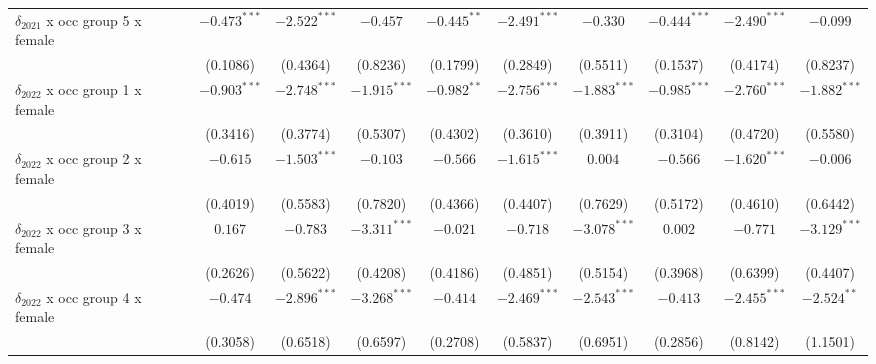 \begin{tabular}{l|ccc|ccc|ccc|}
$\delta_{2021}$ x occ group 5 x female &          $-0.473^{***}$ &  $-2.522^{***}$ &        $-0.457$ &            $-0.445^{**}$ &  $-2.491^{***}$ &        $-0.330$ &           $-0.444^{***}$ &  $-2.490^{***}$ &        $-0.099$ \\
                                       &                (0.1086) &        (0.4364) &        (0.8236) &                 (0.1799) &        (0.2849) &        (0.5511) &                 (0.1537) &        (0.4174) &        (0.8237) \\
$\delta_{2022}$ x occ group 1 x female &          $-0.903^{***}$ &  $-2.748^{***}$ &  $-1.915^{***}$ &            $-0.982^{**}$ &  $-2.756^{***}$ &  $-1.883^{***}$ &           $-0.985^{***}$ &  $-2.760^{***}$ &  $-1.882^{***}$ \\
                                       &                (0.3416) &        (0.3774) &        (0.5307) &                 (0.4302) &        (0.3610) &        (0.3911) &                 (0.3104) &        (0.4720) &        (0.5580) \\
$\delta_{2022}$ x occ group 2 x female &                $-0.615$ &  $-1.503^{***}$ &        $-0.103$ &                 $-0.566$ &  $-1.615^{***}$ &         $0.004$ &                 $-0.566$ &  $-1.620^{***}$ &        $-0.006$ \\
                                       &                (0.4019) &        (0.5583) &        (0.7820) &                 (0.4366) &        (0.4407) &        (0.7629) &                 (0.5172) &        (0.4610) &        (0.6442) \\
$\delta_{2022}$ x occ group 3 x female &                 $0.167$ &        $-0.783$ &  $-3.311^{***}$ &                 $-0.021$ &        $-0.718$ &  $-3.078^{***}$ &                  $0.002$ &        $-0.771$ &  $-3.129^{***}$ \\
                                       &                (0.2626) &        (0.5622) &        (0.4208) &                 (0.4186) &        (0.4851) &        (0.5154) &                 (0.3968) &        (0.6399) &        (0.4407) \\
$\delta_{2022}$ x occ group 4 x female &                $-0.474$ &  $-2.896^{***}$ &  $-3.268^{***}$ &                 $-0.414$ &  $-2.469^{***}$ &  $-2.543^{***}$ &                 $-0.413$ &  $-2.455^{***}$ &   $-2.524^{**}$ \\
                                       &                (0.3058) &        (0.6518) &        (0.6597) &                 (0.2708) &        (0.5837) &        (0.6951) &                 (0.2856) &        (0.8142) &        (1.1501) \\

\end{tabular}
